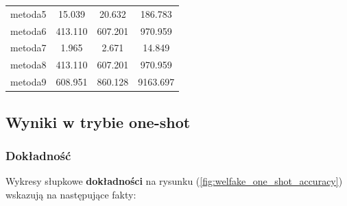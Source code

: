 \begin{table}[H]
\begin{tabular}{lccc}
		metoda5           & 15.039        & 20.632           & 186.783        \\
		metoda6           & 413.110       & 607.201          & 970.959        \\
		metoda7           & 1.965         & 2.671            & 14.849         \\
		metoda8           & 413.110       & 607.201          & 970.959        \\
		metoda9           & 608.951       & 860.128          & 9163.697       \\
		\bottomrule
	\end{tabular}
\end{table}

\subsection{Wyniki w trybie one-shot}
\subsubsection{Dokładność}
Wykresy słupkowe \textbf{dokładności} na rysunku (\ref{fig:welfake_one_shot_accuracy}) wskazują na następujące fakty:


